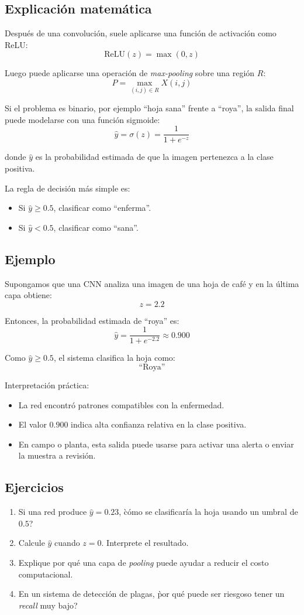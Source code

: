 \documentclass[12pt]{article}
\begin{document}
\subsection{Explicación matemática}
Después de una convolución, suele aplicarse una función de activación como ReLU:
\[
\text{ReLU}(z)=\max(0,z)
\]

Luego puede aplicarse una operación de \textit{max-pooling} sobre una región \(R\):
\[
P = \max_{(i,j)\in R} X(i,j)
\]

Si el problema es binario, por ejemplo ``hoja sana'' frente a ``roya'', la salida final puede modelarse con una función sigmoide:
\[
\hat{y} = \sigma(z)=\frac{1}{1+e^{-z}}
\]

donde \(\hat{y}\) es la probabilidad estimada de que la imagen pertenezca a la clase positiva.

La regla de decisión más simple es:
\begin{itemize}
    \item Si \(\hat{y}\geq 0.5\), clasificar como ``enferma''.
    \item Si \(\hat{y}<0.5\), clasificar como ``sana''.
\end{itemize}

\subsection{Ejemplo}
Supongamos que una CNN analiza una imagen de una hoja de café y en la última capa obtiene:
\[
z=2.2
\]

Entonces, la probabilidad estimada de ``roya'' es:
\[
\hat{y}=\frac{1}{1+e^{-2.2}} \approx 0.900
\]

Como \(\hat{y}\geq 0.5\), el sistema clasifica la hoja como:
\[
\text{``Roya''}
\]

Interpretación práctica:
\begin{itemize}
    \item La red encontró patrones compatibles con la enfermedad.
    \item El valor \(0.900\) indica alta confianza relativa en la clase positiva.
    \item En campo o planta, esta salida puede usarse para activar una alerta o enviar la muestra a revisión.
\end{itemize}

\subsection{Ejercicios}
\begin{enumerate}[label=\arabic*.]
    \item Si una red produce \(\hat{y}=0.23\), \`cómo se clasificaría la hoja usando un umbral de \(0.5\)?
    \item Calcule \(\hat{y}\) cuando \(z=0\). Interprete el resultado.
    \item Explique por qué una capa de \textit{pooling} puede ayudar a reducir el costo computacional.
    \item En un sistema de detección de plagas, \`por qué puede ser riesgoso tener un \textit{recall} muy bajo?
\end{enumerate}
\end{document}
